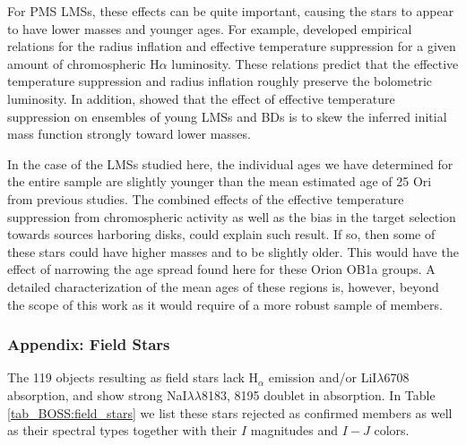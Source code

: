 \documentclass[12pt]{article}
\begin{document}
For PMS LMSs, these effects can be quite important, causing the stars to appear to have lower masses and younger ages. For example, \citet{Stassun2012} developed empirical relations for the radius inflation and effective temperature suppression for a given amount of chromospheric H$\alpha$ luminosity. These relations predict that the effective temperature suppression and radius inflation roughly preserve the bolometric luminosity. In addition, \citet{Stassun2014b} showed that the effect of effective temperature suppression on ensembles of young LMSs and BDs is to skew the inferred initial mass function strongly toward lower masses.  

In the case of the LMSs studied here, the individual ages we have determined for the entire sample are slightly younger than the mean estimated age of 25 Ori from previous studies. The combined effects of the effective temperature suppression from chromospheric activity as well as the bias in the target selection towards sources harboring disks, could explain such result. If so, then some of these stars could have higher masses and to be slightly older. This would have the effect of narrowing the age spread found here for these Orion OB1a groups. A detailed characterization of the mean ages of these regions is, however, beyond the scope of this work as it would require of a more robust sample of members.

\subsubsection{Appendix: Field Stars}
\label{appendix_BOSS}

The 119 objects resulting as field stars lack H$_\alpha$ emission and/or LiI$\lambda$6708 absorption, and show strong NaI$\lambda\lambda$8183, 8195 doublet in absorption. In Table \ref{tab_BOSS:field_stars} we list these stars rejected as confirmed members as well as their spectral types together with their $I$ magnitudes and $I-J$ colors.
\end{document}
